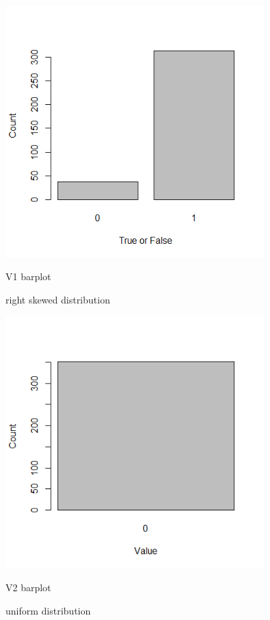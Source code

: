 \documentclass{article}
\begin{document}
\begin{enumerate}
\begin{enumerate}
\begin{lstlisting}
\end{lstlisting}
\end{enumerate}
\begin{figure}
  \includegraphics[width=100mm, scale = 0.5]{barplotV1.png}
  \caption{V1 barplot}
  \caption*{right skewed distribution}
\end{figure}
\begin{figure}
  \includegraphics[width=100mm, scale = 0.5]{barplotV2.png}
  \caption{V2 barplot}
  \caption*{uniform distribution}
\end{figure}
\begin{figure}

\end{figure}
\end{enumerate}
\end{document}
